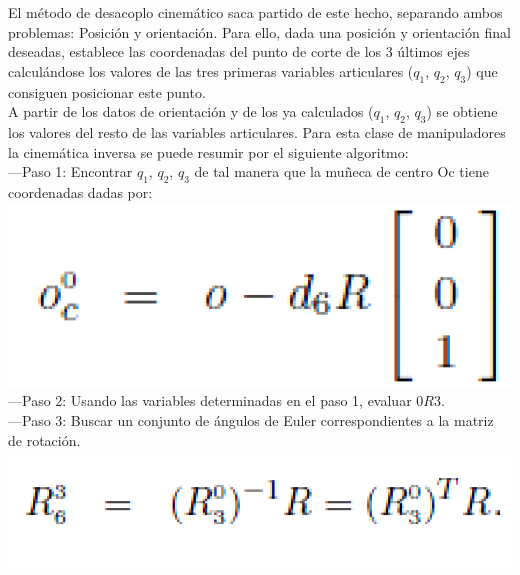 \documentclass[11pt,a4paper,oldfontcommands,oneside]{memoir}
\begin{document}
El método de desacoplo cinemático saca partido de este hecho, separando ambos problemas: Posición y orientación.  Para ello, dada una posición y orientación final deseadas, establece las coordenadas del punto de corte de los 3 últimos ejes calculándose los valores de las tres primeras variables articulares ($q_1$, $q_2$, $q_3$) que consiguen posicionar este punto. \\

A partir de los datos de orientación y de los ya calculados ($q_1$, $q_2$, $q_3$) se obtiene los valores del resto de las variables articulares. Para esta clase de manipuladores la cinemática inversa se puede resumir por el siguiente algoritmo: \\

---Paso 1: Encontrar $q_1$, $q_2$, $q_3$ de tal manera que la muñeca de centro Oc tiene coordenadas dadas por: \\

\includegraphics[scale=.35]{ec1.png} \\

---Paso 2: Usando las variables determinadas en el paso 1, evaluar $0R3$. \\

---Paso 3: Buscar un conjunto de ángulos de Euler correspondientes a la matriz de rotación.\\

\includegraphics[scale=.25]{ec2.png} \\



\end{document}

